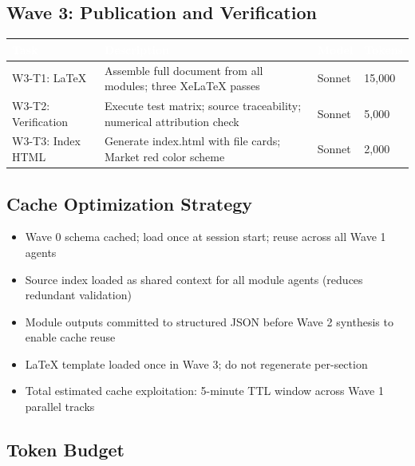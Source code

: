 \documentclass[11pt,letterpaper]{article}
\newcommand{\tableheader}[1]{\textbf{\sffamily\textcolor{white}{#1}}}
\begin{document}
\subsection{Wave 3: Publication and Verification}

\begin{center}
\begin{tabularx}{\textwidth}{L{2.5cm}XC{2cm}C{2cm}}
\toprule
{}
\tableheader{Task} & \tableheader{Description} & \tableheader{Model} & \tableheader{Tokens} \\
\midrule
W3-T1: LaTeX & Assemble full document from all modules; three XeLaTeX passes & Sonnet & 15,000 \\
W3-T2: Verification & Execute test matrix; source traceability; numerical attribution check & Sonnet & 5,000 \\
W3-T3: Index HTML & Generate index.html with file cards; Market red color scheme & Sonnet & 2,000 \\
\bottomrule
\end{tabularx}
\end{center}

\subsection{Cache Optimization Strategy}

\begin{itemize}[leftmargin=1.5em]
  \item Wave 0 schema cached; load once at session start; reuse across all Wave 1 agents
  \item Source index loaded as shared context for all module agents (reduces redundant validation)
  \item Module outputs committed to structured JSON before Wave 2 synthesis to enable cache reuse
  \item LaTeX template loaded once in Wave 3; do not regenerate per-section
  \item Total estimated cache exploitation: 5-minute TTL window across Wave 1 parallel tracks
\end{itemize}

\subsection{Token Budget}
\end{document}
